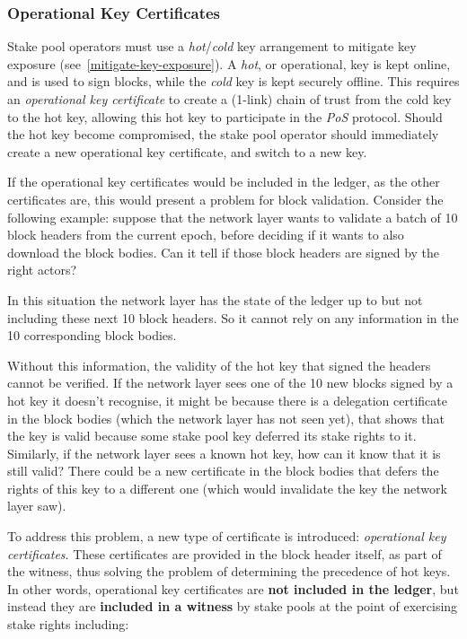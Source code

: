 \documentclass[11pt,a4paper,dvipsnames,twosided]{article}
\begin{document}
\subsubsection{Operational Key Certificates}
\label{operational-key-certificates}

Stake pool operators must use a \emph{hot}/\emph{cold} key
arrangement to mitigate key exposure
(see~\cref{mitigate-key-exposure}). A \emph{hot}, or operational, key
is kept online, and is used to sign blocks, while the \emph{cold} key is
kept securely offline. This requires an \emph{operational key
  certificate} to create a (1-link) chain of trust from the cold key
to the hot key, allowing this hot key to participate in the \emph{PoS}
protocol. Should the hot key become compromised, the stake pool
operator should immediately create a new operational key certificate, and
switch to a new key.

If the operational key certificates would be included in the ledger,
as the other certificates are, this would present a problem for block
validation. Consider the following example: suppose that the network
layer wants to validate a batch of 10 block headers from the current
epoch, before deciding if it wants to also download the block
bodies. Can it tell if those block headers are signed by the right
actors?

In this situation the network layer has the state of the ledger up to
but not including these next 10 block headers. So it cannot rely on
any information in the 10 corresponding block bodies.

Without this information, the validity of the hot key that signed
the headers cannot be verified. If the network layer sees one of the
10 new blocks signed by a hot key it doesn't recognise, it might be
because there is a delegation certificate in the block bodies (which
the network layer has not seen yet), that shows that the key is valid
because some stake pool key deferred its stake rights to it. Similarly,
if the network layer sees a known hot key, how can it know that it
is still valid? There could be a new certificate in the block bodies
that defers the rights of this key to a different one (which would
invalidate the key the network layer saw).

To address this problem, a new type of certificate is introduced:
\emph{operational key certificates}. These certificates are provided
in the block header itself, as part of the witness, thus solving the
problem of determining the precedence of hot keys. In other words,
operational key certificates are \textbf{not included in
  the ledger}, but instead they are \textbf{included in a witness} by
stake pools at the point of exercising stake rights including:
\end{document}
